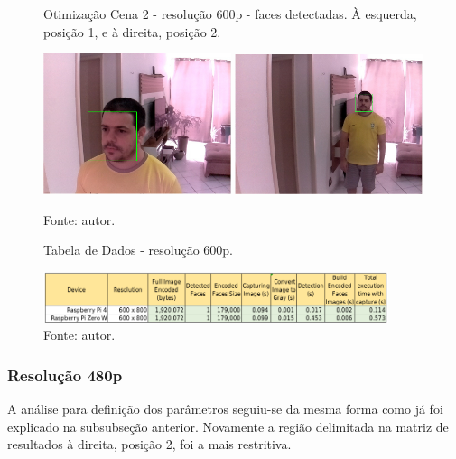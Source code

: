 \begin{figure}[H]
    \centering
    \caption[Otimização Cena 2 - resolução 600p - faces detectadas. À esquerda posição 1 e à direita, posição 2]{Otimização Cena 2 - resolução 600p - faces detectadas. À esquerda, posição 1, e à direita, posição 2.}
    \includegraphics[width=0.49\textwidth]{Cap4_Experimentos_Realizados/Figures/cena2_800x600_pos1_face.jpg}
    \includegraphics[width=0.49\textwidth]{Cap4_Experimentos_Realizados/Figures/cena2_800x600_pos2_face.jpg}
    \caption*{Fonte: autor.}
    \label{fig:otimizacaoCena2_600p_faces}
\end{figure}

\begin{figure}[H]
    \centering
    \caption[Tabela de Dados - resolução 600p.]{Tabela de Dados - resolução 600p.}
    \includegraphics[width=0.90\textwidth]{Cap4_Experimentos_Realizados/Figures/cena2_dados_600p.jpg}
    \caption*{Fonte: autor.}
    \label{fig:dadosCena2_600p}
\end{figure}

\subsubsection{Resolução 480p} \label{sssec:resolution2-2}

A análise para definição dos parâmetros seguiu-se da mesma forma como já foi explicado na subsubseção anterior. Novamente a região delimitada na matriz de resultados à direita, posição 2, foi a mais restritiva.

